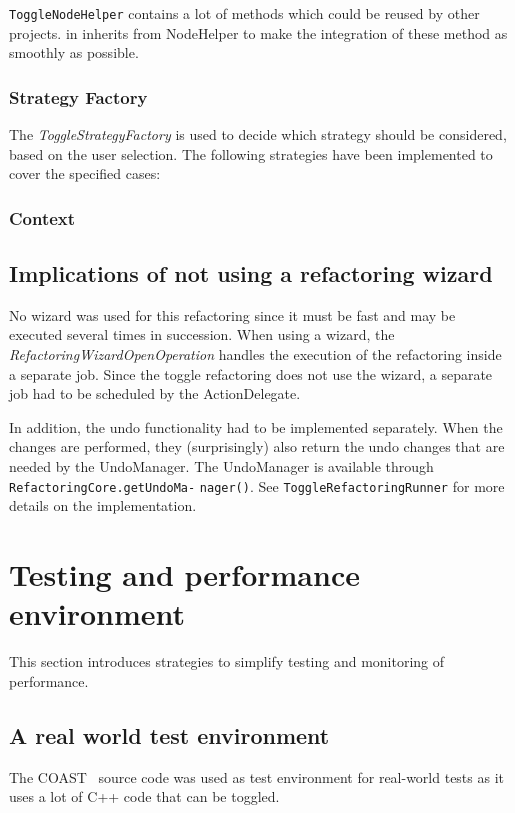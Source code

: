 \texttt{ToggleNodeHelper} contains a lot of methods which could be reused by
other projects. in inherits from NodeHelper to make the integration of these
method as smoothly as possible.

\subsubsection{Strategy Factory}

The \textit{ToggleStrategyFactory} is used to decide which strategy should be 
considered, based on the user selection. The following strategies have been
implemented to cover the specified cases:

\subsubsection{Context}

\subsection{Implications of not using a refactoring wizard}
No wizard was used for this refactoring since it must be fast and may be 
executed several times in succession. When using a wizard, the 
\textit{RefactoringWizardOpenOperation} handles the execution of the refactoring 
inside a separate job. Since the toggle refactoring does not use the wizard, a 
separate job had to be scheduled by the ActionDelegate.

In addition, the undo functionality had to be implemented separately. When the 
changes are performed, they (surprisingly) also return the undo changes that are 
needed by the UndoManager. The UndoManager is available through 
\texttt{RefactoringCore.getUndoMa-} \newline
\texttt{nager()}. See \texttt{ToggleRefactoringRunner} 
for more details on the implementation.

\section{Testing and performance environment}

This section introduces strategies to simplify testing and monitoring of 
performance.

\subsection{A real world test environment}
The COAST~\cite{COAST} source code was used as test environment for real-world 
tests as it uses a lot of C++ code that can be toggled.

